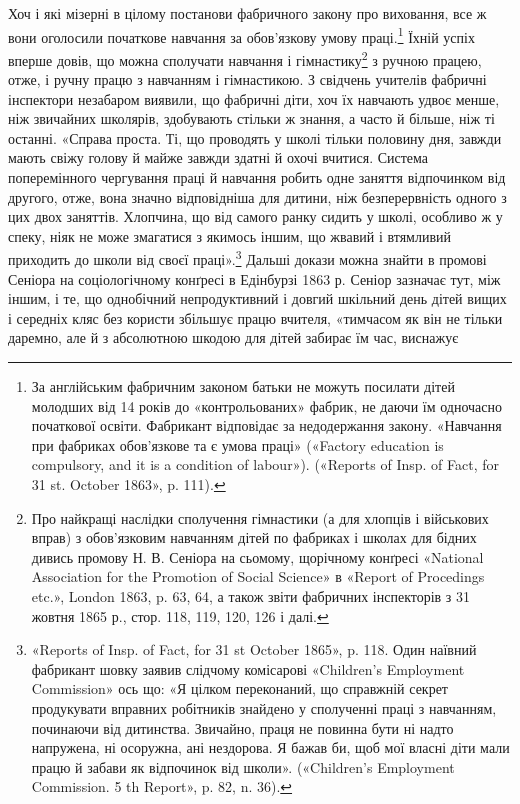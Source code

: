 Хоч і які мізерні в цілому постанови фабричного закону про
виховання, все ж вони оголосили початкове навчання за обов’язкову
умову праці.\footnote{
За англійським фабричним законом батьки не можуть посилати
дітей молодших від 14 років до «контрольованих» фабрик, не даючи
їм одночасно початкової освіти. Фабрикант відповідає за недодержання
закону. «Навчання при фабриках обов'язкове та є умова праці» («Factory
education is compulsory, and it is a condition of labour»). («Reports of
Insp. of Fact, for 31 st. October 1863», p. 111).
} Їхній успіх вперше довів, що можна сполучати
навчання і гімнастику\footnote{
Про найкращі наслідки сполучення гімнастики (а для хлопців
і військових вправ) з обов’язковим навчанням дітей по фабриках і школах
для бідних дивись промову Н. В. Сеніора на сьомому, щорічному конґресі
«National Association for the Promotion of Social Science» в «Report
of Procedings etc.», London 1863, p. 63, 64, а також звіти фабричних інспекторів
з 31 жовтня 1865 р., стор. 118, 119, 120, 126 і далі.
} з ручною працею, отже, і ручну
працю з навчанням і гімнастикою. З свідчень учителів фабричні
інспектори незабаром виявили, що фабричні діти, хоч їх навчають
удвоє менше, ніж звичайних школярів, здобувають стільки ж
знання, а часто й більше, ніж ті останні. «Справа проста. Ті, що
проводять у школі тільки половину дня, завжди мають свіжу
голову й майже завжди здатні й охочі вчитися. Система поперемінного
чергування праці й навчання робить одне заняття відпочинком
від другого, отже, вона значно відповідніша для дитини,
ніж безперервність одного з цих двох заняттів. Хлопчина, що від
самого ранку сидить у школі, особливо ж у спеку, ніяк не може
змагатися з якимось іншим, що жвавий і втямливий приходить до
школи від своєї праці».\footnote{
«Reports of Insp. of Fact, for 31 st October 1865», p. 118. Один
наївний фабрикант шовку заявив слідчому комісарові «Children’s Employment
Commission» ось що: «Я цілком переконаний, що справжній секрет
продукувати вправних робітників знайдено у сполученні праці з навчанням,
починаючи від дитинства. Звичайно, праця не повинна бути ні
надто напружена, ні осоружна, ані нездорова. Я бажав би, щоб мої
власні діти мали працю й забави як відпочинок від школи». («Children’s
Employment Commission. 5 th Report», p. 82, n. 36).
} Дальші докази можна знайти в промові
Сеніора на соціологічному конґресі в Едінбурзі 1863 р. Сеніор
зазначає тут, між іншим, і те, що однобічний непродуктивний і
довгий шкільний день дітей вищих і середніх кляс без користи
збільшує працю вчителя, «тимчасом як він не тільки даремно,
але й з абсолютною шкодою для дітей забирає їм час, виснажує
